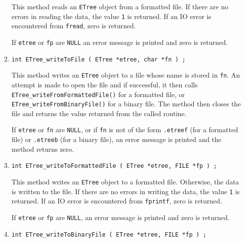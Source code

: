 \begin{enumerate}
\begin{verbatim}
\end{verbatim}
\par
This method reads an {\tt ETree} object from a formatted file.
If there are no errors in reading the data, 
the value {\tt 1} is returned.
If an IO error is encountered from {\tt fread}, zero is returned.
\par {}
If {\tt etree} or {\tt fp} are {\tt NULL} an error message 
is printed and zero is returned.
\item
\begin{verbatim}
int ETree_writeToFile ( ETree *etree, char *fn ) ;
\end{verbatim}
\par
This method writes an {\tt ETree} object to a file
whose name is stored in {\tt *fn}.
An attempt is made to open the file and if successful, 
it then calls {\tt ETree\_writeFromFormattedFile()} 
for a formatted file, or
{\tt ETree\_writeFromBinaryFile()} for a binary file.
The method then closes the file
and returns the value returned from the called routine.
\par {}
If {\tt etree} or {\tt fn} are {\tt NULL}, 
or if {\tt fn} is not of the form
{\tt *.etreef} (for a formatted file) 
or {\tt *.etreeb} (for a binary file),
an error message is printed and the method returns zero.
\item
\begin{verbatim}
int ETree_writeToFormattedFile ( ETree *etree, FILE *fp ) ;
\end{verbatim}
\par
This method writes an {\tt ETree} object to a formatted file.
Otherwise, the data is written to the file.
If there are no errors in writing the data, 
the value {\tt 1} is returned.
If an IO error is encountered from {\tt fprintf}, zero is returned.
\par {}
If {\tt etree} or {\tt fp} are {\tt NULL},
an error message is printed and zero is returned.
\item
\begin{verbatim}
int ETree_writeToBinaryFile ( ETree *etree, FILE *fp ) ;

\end{verbatim}
\end{enumerate}
